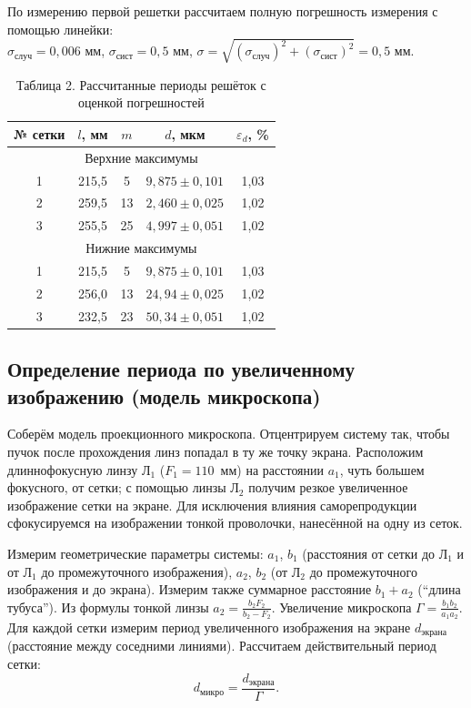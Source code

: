 \documentclass[a4paper]{article}
\begin{document}
По измерению первой решетки рассчитаем полную погрешность измерения с помощью линейки:\\ $\sigma_\text{случ} = 0,006$ мм, $\sigma_\text{сист} = 0,5$ мм, $\sigma = \sqrt{\left ( \sigma_\text{случ}\right )^2 + \left ( \sigma_\text{сист}\right )^2} = 0,5$ мм.
\begin{table}[h!]
\centering
\begin{tabular}{|c|c|c|c|c|}
\hline
№ сетки & $l$, мм & $m$ & $d$, мкм & $\varepsilon_d$, \% \\
\hline
\multicolumn{5}{|c|}{Верхние максимумы} \\
\hline
1 & 215,5 & 5 & $9{,}875 \pm 0{,}101$ & 1,03 \\
\hline
2 & 259,5 & 13 & $2{,}460 \pm 0{,}025$ & 1,02 \\
\hline
3 & 255,5 & 25 & $4{,}997 \pm 0{,}051$ & 1,02 \\
\hline
\multicolumn{5}{|c|}{Нижние максимумы} \\
\hline
1 & 215,5 & 5 & $9{,}875 \pm 0{,}101$ & 1,03 \\
\hline
2 & 256,0 & 13 & $24{,}94 \pm 0{,}025$ & 1,02 \\
\hline
3 & 232,5 & 23 & $50{,}34 \pm 0{,}051$ & 1,02 \\
\hline
\end{tabular}
\caption{Таблица 2. Рассчитанные периоды решёток с оценкой погрешностей}
\label{tab:periods_with_errors}
\end{table}



\subsection{Определение периода по увеличенному изображению (модель микроскопа)}

Соберём модель проекционного микроскопа. Отцентрируем систему так, чтобы пучок после прохождения линз попадал в ту же точку экрана. Расположим длиннофокусную линзу Л$_1$ ($F_1 = 110$~мм) на расстоянии $a_1$, чуть большем фокусного, от сетки; с помощью линзы Л$_2$ получим резкое увеличенное изображение сетки на экране. Для исключения влияния саморепродукции сфокусируемся на изображении тонкой проволочки, нанесённой на одну из сеток.

Измерим геометрические параметры системы: $a_1$, $b_1$ (расстояния от сетки до Л$_1$ и от Л$_1$ до промежуточного изображения), $a_2$, $b_2$ (от Л$_2$ до промежуточного изображения и до экрана). Измерим также суммарное расстояние $b_1 + a_2$ (``длина тубуса''). Из формулы тонкой линзы $a_{2}=\frac{b_{2} F_{2}}{b_{2}-F_{2}}$. Увеличение микроскопа $\Gamma=\frac{b_{1} b_{2}}{a_{1} a_{2}}$. Для каждой сетки измерим период увеличенного изображения на экране $d_{\text{экрана}}$ (расстояние между соседними линиями). Рассчитаем действительный период сетки:
\begin{equation}
    d_{\text{микро}} = \frac{d_{\text{экрана}}}{\Gamma}.
    \label{eq:d_micro}
\end{equation}
\end{document}
